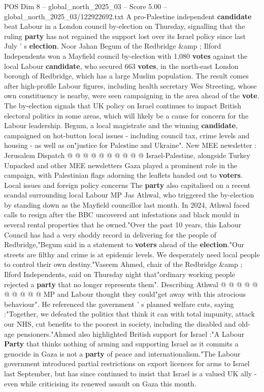 \begin{textsample}{POS Dim 8 – global\_north\_2025\_03 – Score 5.00 – global\_north\_2025\_03/122922692.txt}  \label{ex:f8_pos_335}
A pro-Palestine independent \textbf{candidate} beat Labour in a London council by-election on Thursday, signalling that the ruling \textbf{party} has not regained the support lost over its Israel policy since last July ' s \textbf{election}.
Noor Jahan Begum of the Redbridge \&amp ; Ilford Independents won a Mayfield council by-election with 1,080 \textbf{votes} against the local Labour \textbf{candidate}, who secured 663 \textbf{votes}, in the north-east London borough of Redbridge, which has a large Muslim population.
The result comes after high-profile Labour figures, including health secretary Wes Streeting, whose own constituency is nearby, were seen campaigning in the area ahead of the \textbf{vote}.
The by-election signals that UK policy on Israel continues to impact British electoral politics in some areas, which will likely be a cause for concern for the Labour leadership.
Begum, a local magistrate and the winning \textbf{candidate}, campaigned on hot-button local issues - including council tax, crime levels and housing - as well as on"justice for Palestine and Ukraine".
New MEE newsletter : Jerusalem Dispatch @ @ @ @ @ @ @ @ @ @ Israel-Palestine, alongside Turkey Unpacked and other MEE newsletters Gaza played a prominent role in the campaign, with Palestinian flags adorning the leaflets handed out to \textbf{voters}.
Local issues and foreign policy concerns The \textbf{party} also capitalised on a recent scandal surrounding local Labour MP Jas Athwal, who triggered the by-election by standing down as the Mayfield councillor last month.
In 2024, Athwal faced calls to resign after the BBC uncovered ant infestations and black mould in several rental properties that he owned."Over the past 10 years, this Labour Council has had a very shoddy record in delivering for the people of Redbridge,"Begum said in a statement to \textbf{voters} ahead of the \textbf{election}."Our streets are filthy and crime is at epidemic levels.
We desperately need local people to control their own destiny."Vaseem Ahmed, chair of the Redbridge \&amp ; Ilford Independents, said on Thursday night that"ordinary working people rejected a \textbf{party} that no longer represents them".
Describing Athwal @ @ @ @ @ @ @ @ @ @ MP and Labour thought they could"get away with this atrocious behaviour".
He referenced the government ' s planned welfare cuts, saying :"Together, we defeated the politics that think it can with total impunity, attack our NHS, cut benefits to the poorest in society, including the disabled and old-age pensioners."Ahmed also highlighted British support for Israel :"A Labour \textbf{Party} that thinks nothing of arming and supporting Israel as it commits a genocide in Gaza is not a \textbf{party} of peace and internationalism."The Labour government introduced partial restrictions on export licences for arms to Israel last September, but has since continued to insist that Israel is a valued UK ally - even while criticising its renewed assault on Gaza this month.

\end{textsample}
